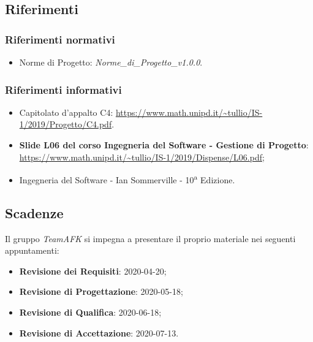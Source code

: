 \subsection{Riferimenti}
\subsubsection{Riferimenti normativi}
\begin{itemize}
	\item Norme di Progetto: \textit{Norme\_di\_Progetto\_v1.0.0}.
\end{itemize}
\subsubsection{Riferimenti informativi}
\begin{itemize}
	\item Capitolato d'appalto C4: \url{https://www.math.unipd.it/~tullio/IS-1/2019/Progetto/C4.pdf}.
	\item \textbf{Slide L06 del corso Ingegneria del Software - Gestione di Progetto}: \\
	\url{https://www.math.unipd.it/~tullio/IS-1/2019/Dispense/L06.pdf};
	\item Ingegneria del Software - Ian Sommerville - 10\textsuperscript{a} Edizione.
\end{itemize}
\subsection{Scadenze}
Il gruppo \textit{TeamAFK} si impegna a presentare il proprio materiale nei seguenti appuntamenti:\\
\begin{itemize}
\item \textbf{Revisione dei Requisiti}: 2020-04-20;
\item \textbf{Revisione di Progettazione}: 2020-05-18;
\item \textbf{Revisione di Qualifica}: 2020-06-18;
\item \textbf{Revisione di Accettazione}: 2020-07-13. 
\end{itemize}
